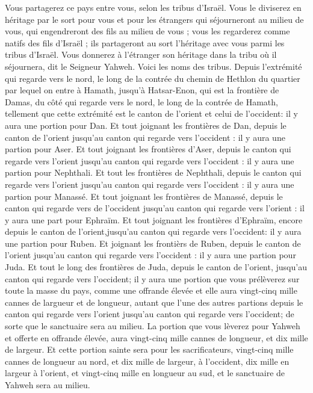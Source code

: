 \begin{multicols}{2}
Vous partagerez ce pays entre vous, selon les tribus d'Israël.
Vous le diviserez en héritage par le sort pour vous et pour les étrangers qui séjourneront au milieu de vous, qui engendreront des fils au milieu de vous ; vous les regarderez comme natifs des fils d'Israël ; ils partageront au sort l'héritage avec vous parmi les tribus d'Israël.
Vous donnerez à l'étranger son héritage dans la tribu où il séjournera, dit le Seigneur Yahweh.
\VerseOne{}Voici les noms des tribus. Depuis l'extrémité qui regarde vers le nord, le long de la contrée du chemin de Hethlon du quartier par lequel on entre à Hamath, jusqu'à Hatsar-Enon, qui est la frontière de Damas, du côté qui regarde vers le nord, le long de la contrée de Hamath, tellement que cette extrémité est le canton de l'orient et celui de l'occident: il y aura une portion pour Dan.
Et tout joignant les frontières de Dan, depuis le canton de l'orient jusqu'au canton qui regarde vers l'occident : il y aura une partion pour Aser.
Et tout joignant les frontières d'Aser, depuis le canton qui regarde vers l'orient jusqu'au canton qui regarde vers l'occident : il y aura une partion pour Nephthali.
Et tout les frontières de Nephthali, depuis le canton qui regarde vers l'orient jusqu'au canton qui regarde vers  l'occident : il y aura une partion pour Manassé. 
Et tout joignant les frontières de Manassé, depuis le canton qui regarde vers de l'occident jusqu'au canton qui regarde vers  l'orient : il y aura une part pour Ephraïm. 
Et tout joignant les frontières d'Ephraïm, encore depuis le canton de l'orient,jusqu'au canton qui regarde vers l'occident: il y aura une partion pour Ruben. 
Et joignant les frontièrs de Ruben, depuis le canton de l'orient jusqu'au canton qui regarde vers l'occident : il y aura une partion pour Juda.
Et tout le long des frontières de Juda, depuis le canton de l'orient, jusqu'au canton qui regarde vers l'occident; il y aura une portion que vous prélèverez sur toute la masse du pays, comme une offrande élevée et elle aura vingt-cinq mille cannes de largueur et de longueur, autant que l'une des autres partions depuis le canton qui regarde vers l'orient jusqu'au canton qui regarde vers l'occident; de sorte que le sanctuaire sera au milieu.
La portion que vous lèverez pour Yahweh et offerte en offrande élevée, aura vingt-cinq mille cannes de longueur, et dix mille de largeur.
Et cette portion sainte sera pour les sacrificateurs, vingt-cinq mille cannes de longueur au nord, et dix mille de largeur, à l'occident, dix mille en largeur à l'orient, et vingt-cinq mille en longueur au sud, et le sanctuaire de Yahweh sera au milieu.

\end{multicols}
